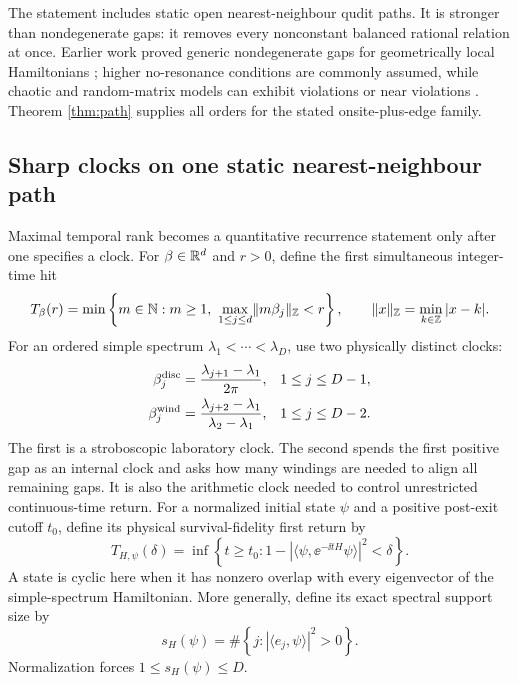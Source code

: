 The statement includes static open nearest-neighbour qudit paths.  It is
stronger than nondegenerate gaps: it removes every nonconstant balanced
rational relation at once.  Earlier work proved generic nondegenerate gaps
for geometrically local Hamiltonians \cite{Huang2021}; higher no-resonance
conditions are commonly assumed, while chaotic and random-matrix models can
exhibit violations or near violations \cite{RiddellPagliaroli2023}.  Theorem
\ref{thm:path} supplies all orders for
the stated onsite-plus-edge family.

\subsection{Sharp clocks on one static nearest-neighbour path}

Maximal temporal rank becomes a quantitative recurrence statement only after
one specifies a clock.  For $\beta\in\mathbb R^d$ and $r>0$, define the first
simultaneous integer-time hit
\begin{equation}
 T_\beta(r)=\min\left\{m\in\mathbb N:m\ge1,\
   \max_{1\le j\le d}\lVert m\beta_j\rVert_\mathbb Z<r\right\},
 \qquad
 \lVert x\rVert_\mathbb Z=\min_{k\in\mathbb Z}|x-k|.              \label{eq:local-first-hit}
\end{equation}
For an ordered simple spectrum
$\lambda_1<\cdots<\lambda_D$, use two physically distinct clocks:
\begin{align}
 \beta^{\rm disc}_j&=\frac{\lambda_{j+1}-\lambda_1}{2\pi},
   &&1\le j\le D-1,                                      \label{eq:local-disc-beta}\\
 \beta^{\rm wind}_j&=\frac{\lambda_{j+2}-\lambda_1}
                           {\lambda_2-\lambda_1},
   &&1\le j\le D-2.                                      \label{eq:local-wind-beta}
\end{align}
The first is a stroboscopic laboratory clock.  The second spends the first positive gap
as an internal clock and asks how many windings are needed to align all
remaining gaps.  It is also the arithmetic clock needed to control unrestricted
continuous-time return.  For a normalized initial state $\psi$ and a positive
post-exit cutoff $t_0$, define its physical survival-fidelity first return by
\begin{equation}
 T_{H,\psi}(\delta)=\inf\left\{t\ge t_0:
  1-|\langle\psi,\ee^{-\ii tH}\psi\rangle|^2<\delta\right\}.
 \label{eq:local-physical-first-return}
\end{equation}
A state is cyclic here when it has nonzero overlap with every eigenvector of
the simple-spectrum Hamiltonian.  More generally, define its exact spectral
support size by
\begin{equation}
 s_H(\psi)=\#\left\{j:|\langle e_j,\psi\rangle|^2>0\right\}.
 \label{eq:spectral-support-size}
\end{equation}
Normalization forces $1\le s_H(\psi)\le D$.

